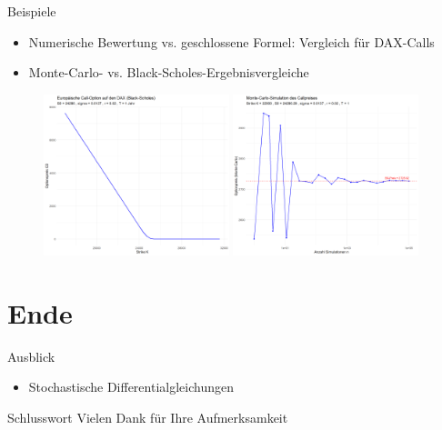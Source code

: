 \documentclass{beamer}
\begin{document}
\begin{frame}{Beispiele}
  \begin{itemize}
      \item Numerische Bewertung vs. geschlossene Formel: Vergleich für DAX-Calls
      \item Monte-Carlo- vs. Black-Scholes-Ergebnisvergleiche
  \end{itemize}
  \begin{figure}
    \centering
  \includegraphics[width=0.48\textwidth]{../thesis/images/call_dax_bs.png}
  \includegraphics[width=0.48\textwidth]{../thesis/images/call_dax_mc.png}
  \end{figure}
\end{frame}

\section{Ende}

\begin{frame}{Ausblick}
  \begin{itemize}
    \item Stochastische Differentialgleichungen
  \end{itemize}
\end{frame}

\begin{frame}{Schlusswort}
  \centering
  \Huge Vielen Dank für Ihre Aufmerksamkeit\\
\end{frame}
\end{document}
